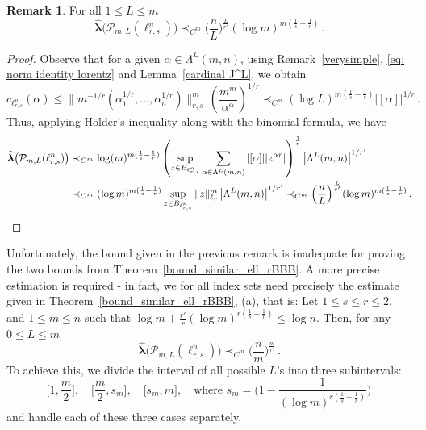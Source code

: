 \documentclass[12pt]{amsart}
\numberwithin{subsection}{section}
\theoremstyle{definition}
\newtheorem{remark}[theorem]{Remark}
\theoremstyle{remark}
\begin{document}
\begin{remark}\label{rem: bound coef functional ell_r,s}
For all $1 \leq L \leq m$
\[
\widehat{\boldsymbol{\lambda}}\big(\mathcal P_{m,L}(\ell_{r,s}^n)\big)
\prec_{C^m} \Big(\frac{n}{L}\Big)^{\frac{L}{r'}}(\log m)^{m(\frac1{s}-\frac1{r})}\,.
\]
\end{remark}

\begin{proof}
Observe that for a given $\alpha \in \Lambda^L(m,n)$, using 
Remark~\ref{verysimple}, \eqref{eq: norm identity lorentz}
and Lemma~\ref{cardinal J^L}, we obtain
\begin{equation*}\label{eq: bound c_alpha J^L}
c_{\ell_{r,s}^n}(\alpha)
\le {\big\|m^{-1/r}(\alpha_1^{1/r},\dots,\alpha_n^{1/r})\big\|_{r,s}^{m}} \, \left( \frac{m^{m}}{\alpha^\alpha} \right)^{1/r}\prec_{C^m}
(\log L)^{m(\frac1{s}-\frac1{r})}|[\alpha]|^{1/r}\,.
\end{equation*}
Thus, applying H\"older's inequality along with the binomial formula, we have 
\begin{align*}
\widehat{\boldsymbol{\lambda}}\big(\mathcal P_{m,L}(\ell_{r,s}^n)\big)
 & \prec_{C^m}
\log(m)^{m(\frac1{s}-\frac1{r})} \left(\sup_{z \in B_{\ell_{r,s}^n}}\sum_{\alpha \in \Lambda^{L}(m,n)} |[\alpha]||z^{\alpha r}| \right)^\frac{1}{r}\left|
\Lambda^{L}(m,n) \right|^{1/r'} \nonumber\\
& \prec_{C^m} (\log m)^{m(\frac1{s}-\frac1{r})} \sup_{z \in B_{\ell_{r,s}^n}}\|z\|_{\ell_r}^{m}\left| \Lambda^{L}(m,n) \right|^{1/r'} \prec_{C^m} \Big(\frac{n}{L}\Big)^{\frac{L}{r'}}
(\log m)^{m(\frac1{s}-\frac1{r})}\,.\qedhere
\end{align*}
\end{proof}

Unfortunately, the bound given in the previous remark is inadequate for proving the two bounds from Theorem~\ref{bound_similar_ell_rBBB}.
A more precise estimation is required - in fact, we for all index sets need precisely the estimate given in Theorem~\ref{bound_similar_ell_rBBB},
(a), that is: Let  $1\le s \le r\le 2$, and  $1\le m\le n$ such that $\log m + \frac{r'}{r}(\log m)^{r(\frac1{s}-\frac1{r})}\le  \log n$.
Then, for any $0\le L\le m$
\begin{equation} \label{proj lorentz s<r - ell_r bound}
\widehat{\boldsymbol{\lambda}}\big(\mathcal P_{m,L}(\ell_{r,s}^n)\big)  \prec_{C^m} \Big(\frac{n}{m}\Big)^{\frac{m}{r'}}\,.
\end{equation}
To achieve this, we divide the interval of all possible \(L\)'s into three subintervals:
\[
\Big[1, \frac{m}{2}\Big], \quad \Big[\frac{m}{2}, s_m\Big], \quad \Big[s_m, m\Big],
\quad
\text{where $s_m =\Big(1-\frac{1}{(\log m)^{r(\frac1{s}-\frac1{r})}}\Big)$}\,
\]
and handle each of these three cases separately.
\end{document}
